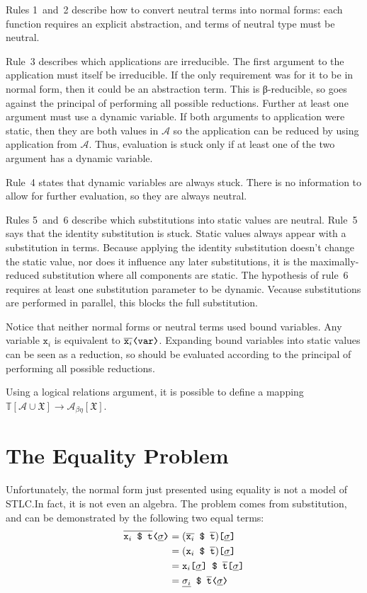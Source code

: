 \documentclass[11pt,a4paper]{article}
\newcommand*\Litt[1]{\texttt{#1}}
\newcommand*\Var[1]{\Litt{x}_{#1}}
\newcommand*\Lapp[2]{\texttt{\ensuremath{#1} \$ \ensuremath{#2}}}
\newcommand*\Lsub[2]{\texttt{\ensuremath{#1}[\ensuremath{#2}]}}
\newcommand*\mvar[2]{\texttt{\ensuremath{#1}⟨\ensuremath{#2}⟩}}
\newcommand*\sta[1]{\mathop{\overline{#1}}}
\newcommand*\dyn[1]{\mathop{\underline{#1}}}
\begin{document}
Rules 1~and~2 describe how to convert neutral terms into normal forms: each
function requires an explicit abstraction, and terms of neutral type must be
neutral.

Rule~3 describes which applications are irreducible. The first argument to the
application must itself be irreducible. If the only requirement was for it to be
in normal form, then it could be an abstraction term. This is β-reducible, so
goes against the principal of performing all possible reductions. Further at
least one argument must use a dynamic variable. If both arguments to application
were static, then they are both values in \(\mathcal{A}\) so the application can be
reduced by using application from \(\mathcal{A}\). Thus, evaluation is stuck only if at
least one of the two argument has a dynamic variable.

Rule~4 states that dynamic variables are always stuck. There is no information
to allow for further evaluation, so they are always neutral.

Rules 5~and~6 describe which substitutions into static values are neutral.
Rule~5 says that the identity substitution is stuck. Static values always appear
with a substitution in terms. Because applying the identity substitution doesn't
change the static value, nor does it influence any later substitutions, it is
the maximally-reduced substitution where all components are static. The
hypothesis of rule~6 requires at least one substitution parameter to be dynamic.
Vecause substitutions are performed in parallel, this blocks the full
substitution.

Notice that neither normal forms or neutral terms used bound variables. Any
variable \(\Var{i}\) is equivalent to \(\mvar{\sta{\Var{i}}}{\mathtt{var}}\).
Expanding bound variables into static values can be seen as a reduction, so
should be evaluated according to the principal of performing all possible
reductions.

Using a logical relations argument, it is possible to define a mapping
\(\mathbb{T}[\mathcal{A} \cup \mathfrak{X}] \to \mathcal{A}_{\beta\eta}[\mathfrak{X}]\)\footnotemark{}.


\section{The Equality Problem}

Unfortunately, the normal form just presented using equality is not a model of
STLC.\@ In fact, it is not even an algebra. The problem comes from substitution,
and can be demonstrated by the following two equal terms:
\begin{align*}
\mvar{\sta{\Lapp{\Var{i}}{\Litt{t}}}}{\dyn{\sigma}}
  &= \Lsub{(\Lapp{\sta{\Var{i}}}{\sta{\Litt{t}}})}{\dyn{\sigma}} \\
  &= \Lsub{(\Lapp{\Var{i}}{\sta{\Litt{t}}})}{\dyn{\sigma}} \\
  &= \Lapp{\Lsub{\Var{i}}{\dyn{\sigma}}}{\Lsub{\sta{\Litt{t}}}{\dyn{\sigma}}} \\
  &= \Lapp{\dyn{\sigma_i}}{\mvar{\sta{\Litt{t}}}{\dyn{\sigma}}}
\end{align*}
\end{document}
